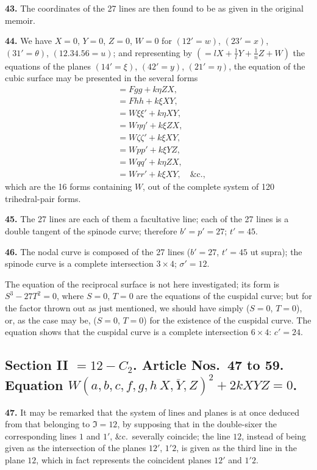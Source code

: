 \documentclass[11pt,a4paper]{article}
\theoremstyle{definition}
\begin{document}
\textbf{43.} The coordinates of the 27 lines are then found to be as given in the original memoir.

\textbf{44.} We have $X = 0$, $Y = 0$, $Z = 0$, $W = 0$ for $(12' = w)$, $(23' = x)$, $(31' = \theta)$, $(12.34.56 = u)$; and representing by $(= lX + \tfrac{1}{l}Y + \tfrac{1}{n}Z + W)$ the equations of the planes $(14' = \xi)$, $(42' = y)$, $(21' = \eta)$, the equation of the cubic surface may be presented in the several forms
\begin{align*}
&= Fgg + k\eta ZX, \\
&= Fhh + k\xi XY, \\
&= W\xi\xi' + k\eta XY, \\
&= W\eta\eta' + k\xi ZX, \\
&= W\zeta\zeta' + k\xi XY, \\
&= Wpp' + k\xi YZ, \\
&= Wqq' + k\eta ZX, \\
&= Wrr' + k\xi XY, \quad \text{\&c.},
\end{align*}
which are the 16 forms containing $W$, out of the complete system of 120 trihedral-pair forms.

\textbf{45.} The 27 lines are each of them a facultative line; each of the 27 lines is a double tangent of the spinode curve; therefore $b' = p' = 27$; $t' = 45$.

\textbf{46.} The nodal curve is composed of the 27 lines ($b' = 27$, $t' = 45$ ut supra); the spinode curve is a complete intersection $3 \times 4$; $\sigma' = 12$.

The equation of the reciprocal surface is not here investigated; its form is $S^3 - 27T^2 = 0$, where $S = 0$, $T = 0$ are the equations of the cuspidal curve; but for the factor thrown out as just mentioned, we should have simply ($S = 0$, $T = 0$), or, as the case may be, ($S = 0$, $T = 0$) for the existence of the cuspidal curve. The equation shows that the cuspidal curve is a complete intersection $6 \times 4$: $c' = 24$.

\newpage
\setcounter{page}{383}

\subsection*{Section II $= 12 - C_2$. Article Nos.~47 to 59. Equation $W(a, b, c, f, g, h \,\overline{\!\!X, Y, Z\!\!})^2 + 2kXYZ = 0$.}

\textbf{47.} It may be remarked that the system of lines and planes is at once deduced from that belonging to $\mathfrak{I} = 12$, by supposing that in the double-sixer the corresponding lines $1$ and $1'$, \&c.\ severally coincide; the line $12$, instead of being given as the intersection of the planes $12'$, $1'2$, is given as the third line in the plane $12$, which in fact represents the coincident planes $12'$ and $1'2$.
\end{document}
